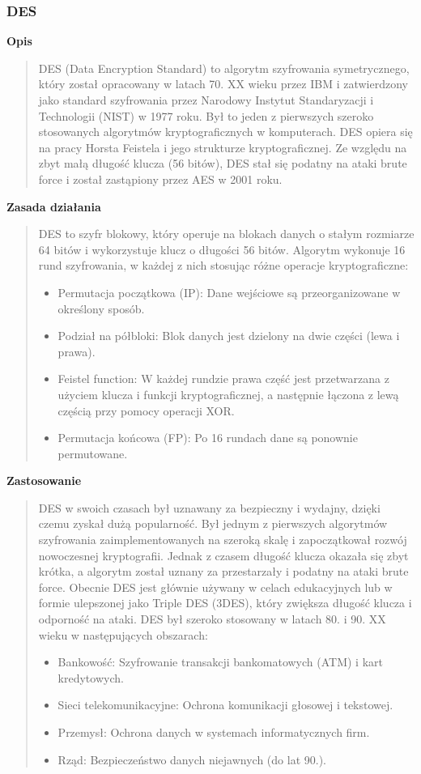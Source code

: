 \documentclass[12pt,a4paper]{article}
\begin{document}
\subsubsection{DES}
\noindent\textbf{Opis}
\begin{quotation}\noindent DES (Data Encryption Standard) to algorytm szyfrowania symetrycznego, który został opracowany w latach 70. XX wieku przez IBM i zatwierdzony jako standard szyfrowania przez Narodowy Instytut Standaryzacji i Technologii (NIST) w 1977 roku. Był to jeden z pierwszych szeroko stosowanych algorytmów kryptograficznych w komputerach. DES opiera się na pracy Horsta Feistela i jego strukturze kryptograficznej. Ze względu na zbyt małą długość klucza (56 bitów), DES stał się podatny na ataki brute force i został zastąpiony przez AES w 2001 roku.
\end{quotation}

\noindent\textbf{Zasada działania}
\begin{quotation}\noindent DES to szyfr blokowy, który operuje na blokach danych o stałym rozmiarze 64 bitów i wykorzystuje klucz o długości 56 bitów. Algorytm wykonuje 16 rund szyfrowania, w każdej z nich stosując różne operacje kryptograficzne:
\begin{itemize}
\item Permutacja początkowa (IP): Dane wejściowe są przeorganizowane w określony sposób.
\item Podział na półbloki: Blok danych jest dzielony na dwie części (lewa i prawa).
\item Feistel function: W każdej rundzie prawa część jest przetwarzana z użyciem klucza i funkcji kryptograficznej, a następnie łączona z lewą częścią przy pomocy operacji XOR.
\item Permutacja końcowa (FP): Po 16 rundach dane są ponownie permutowane.
\end{itemize}
\end{quotation}

\noindent\textbf{Zastosowanie}
\begin{quotation}\noindent DES w swoich czasach był uznawany za bezpieczny i wydajny, dzięki czemu zyskał dużą popularność. Był jednym z pierwszych algorytmów szyfrowania zaimplementowanych na szeroką skalę i zapoczątkował rozwój nowoczesnej kryptografii. Jednak z czasem długość klucza okazała się zbyt krótka, a algorytm został uznany za przestarzały i podatny na ataki brute force. Obecnie DES jest głównie używany w celach edukacyjnych lub w formie ulepszonej jako Triple DES (3DES), który zwiększa długość klucza i odporność na ataki. DES był szeroko stosowany w latach 80. i 90. XX wieku w następujących obszarach:
\begin{itemize}
\item Bankowość: Szyfrowanie transakcji bankomatowych (ATM) i kart kredytowych.
\item Sieci telekomunikacyjne: Ochrona komunikacji głosowej i tekstowej.
\item Przemysł: Ochrona danych w systemach informatycznych firm.
\item Rząd: Bezpieczeństwo danych niejawnych (do lat 90.).
\end{itemize}
\end{quotation}
\end{document}
